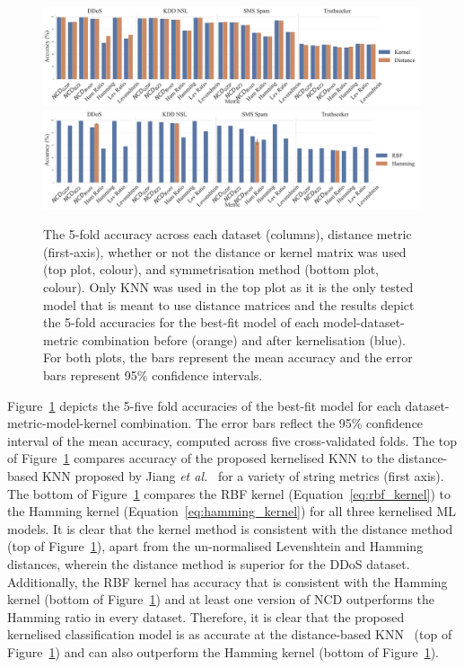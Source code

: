 \documentclass[preprint,12pt]{article}
\begin{document}
\begin{figure}[!htb]
    \centering
    \includegraphics[width=0.99\textwidth]{images/accuracy_vs_kernel.pdf}
    \hfill
    \includegraphics[width=0.99\textwidth]{images/accuracy_vs_rbf_or_hamming.pdf}
    \caption{
    The 5-fold accuracy across each dataset (columns), distance metric (first-axis), whether or not the distance or kernel matrix was used (top plot, colour), and symmetrisation method (bottom plot, colour). 
    Only KNN was used in the top plot as it is the only tested model that is meant to use distance matrices and the results depict the 5-fold accuracies for the best-fit model of each model-dataset-metric combination before (orange) and after kernelisation (blue).
    For both plots, the bars represent the mean accuracy and the error bars represent 95\% confidence intervals.
    }
    \label{fig:baseline}
\end{figure}


Figure~\ref{fig:baseline} depicts the 5-five fold accuracies of the best-fit model for each dataset-metric-model-kernel combination. 
The error bars reflect the 95\% confidence interval of the mean accuracy, computed across five cross-validated folds. 
The top of Figure~\ref{fig:baseline} compares accuracy of the proposed kernelised KNN to the distance-based KNN proposed by Jiang \textit{et al.}~\cite{jiang2022less} for a variety of string metrics (first axis). 
The bottom of Figure~\ref{fig:baseline} compares the RBF kernel (Equation~\ref{eq:rbf_kernel}) to the Hamming kernel (Equation~\ref{eq:hamming_kernel}) for all three kernelised ML models. 
It is clear that the kernel method is consistent with the distance method (top of Figure~\ref{fig:baseline}), apart from the un-normalised Levenshtein and Hamming distances, wherein the distance method is superior for the DDoS dataset. 
Additionally, the RBF kernel has accuracy that is consistent with the Hamming kernel (bottom of Figure~\ref{fig:baseline}) and at least one version of NCD outperforms the Hamming ratio in every dataset. 
Therefore, it is clear that the proposed kernelised classification model is as accurate at the distance-based KNN~\cite{jiang2022less} (top of Figure~\ref{fig:baseline}) and can also outperform the Hamming kernel (bottom of Figure~\ref{fig:baseline}). 
\end{document}
